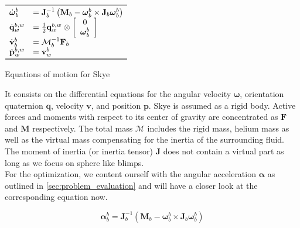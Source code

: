 \begin{table}[htb!]
\centering
$\begin{array}{ll}
\toprule
\dot{\boldsymbol{\omega}}_b^b &= \mathbf{J}_b^{-1} \left( \mathbf{M}_b  - \boldsymbol{\omega}_b^b \times \mathbf{J}_b \boldsymbol{\omega}_b^b \right) \\

\dot{\mathbf{q}}_w^{b,w} &= \frac{1}{2} \mathbf{q}_w^{b,w} \otimes \left[
\begin{array}{c}
	0 \\ \boldsymbol{\omega}_b^b
\end{array} \right] \\

\dot{\mathbf{v}}_b^b &= \mathbf{\mathcal{M}}_b^{-1} \mathbf{F}_b \\

\dot{\mathbf{p}}_w^{b,w} &= \mathbf{v}_w^b \\

\bottomrule
\end{array}$
\caption{Equations of motion for Skye}
\label{tab:sys_mod}
\end{table}

It consists on the differential equations for the angular velocity $\boldsymbol{\omega}$, orientation quaternion $\mathbf{q}$, velocity $\mathbf{v}$, and position $\mathbf{p}$.
Skye is assumed as a rigid body.
Active forces and moments with respect to its center of gravity are concentrated as $\mathbf{F}$ and $\mathbf{M}$ respectively.
The total mass $\mathbf{\mathcal{M}}$ includes the rigid mass, helium mass as well as the virtual mass compensating for the inertia of the surrounding fluid.
The moment of inertia (or inertia tensor) $\mathbf{J}$ does not contain a virtual part as long as we focus on sphere like blimps.
\\
For the optimization, we content ourself with the angular acceleration $\boldsymbol{\alpha}$ as outlined in \cref{sec:problem_evaluation} and will have a closer look at the corresponding equation now.

\begin{equation}
\label{eq:angular_accel}
\boldsymbol{\alpha}_b^b = \mathbf{J}_b^{-1} \left( \mathbf{M}_b  - \boldsymbol{\omega}_b^b \times \mathbf{J}_b \boldsymbol{\omega}_b^b \right)
\end{equation}

